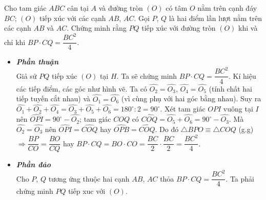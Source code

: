 \begin{vd}%
	Cho tam giác $ABC$ cân tại $A$ và đường tròn $(O)$ có tâm $O$ nằm trên cạnh đáy $BC$; $(O)$ tiếp xúc với các cạnh $AB$, $AC$. Gọi $P$, $Q$ là hai điểm lần lượt nằm trên các cạnh $AB$ và $AC$. Chứng minh rằng $PQ$ tiếp xúc với đường tròn $(O)$ khi và chỉ khi $BP\cdot CQ=\dfrac{BC^2}{4}$.
	\loigiai
	{
	\begin{itemize}
	\item \textbf{\textit{Phần thuận}}\\
	Giả sử $PQ$ tiếp xúc $(O)$ tại $H$. Ta sẽ chứng minh $BP\cdot CQ=\dfrac{BC^2}{4}$. Kí hiệu các tiếp điểm, các góc như hình vẽ. Ta có $\widehat{O_2}=\widehat{O_3}$, $\widehat{O_4}=\widehat{O_5}$ (tính chất hai tiếp tuyến cắt nhau) và $\widehat{O_1}=\widehat{O_6}$ (vì cùng phụ với hai góc bằng nhau). Suy ra $\widehat{O_1}+\widehat{O_2}+\widehat{O_4}=\widehat{O_3}+\widehat{O_5}+\widehat{O_6}=180^\circ:2=90^\circ$. Xét tam giác $OPI$ vuông tại $I$ nên $\widehat{OPI}=90^\circ-\widehat{O_2}$; tam giác $COQ$ có $\widehat{COQ}=\widehat{O_5}+\widehat{O_6}=90^\circ-\widehat{O_3}$. Mà $\widehat{O_2}=\widehat{O_3}$ nên $\widehat{OPI}=\widehat{COQ}$ hay $\widehat{OPB}=\widehat{COQ}$. Do đó $\triangle BPO\equiv \triangle COQ$ (g.g) $\Rightarrow \dfrac{BP}{CO}=\dfrac{BO}{CQ}$ hay $BP\cdot CQ=BO\cdot CO=\dfrac{BC}{2}\cdot \dfrac{BC}{2}=\dfrac{BC^2}{4}$.
	\item \textbf{\textit{Phần đảo}}\\
	Cho $P$, $Q$ tương ứng thuộc hai cạnh $AB$, $AC$ thỏa $BP\cdot CQ=\dfrac{BC^2}{4}$. Ta phải chứng minh $PQ$ tiếp xuc với $(O)$. 
\end{itemize}}
\end{vd}
